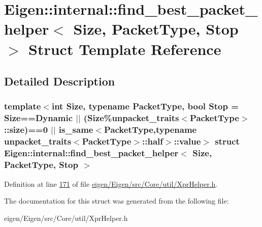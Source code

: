 \hypertarget{struct_eigen_1_1internal_1_1find__best__packet__helper}{}\section{Eigen\+:\+:internal\+:\+:find\+\_\+best\+\_\+packet\+\_\+helper$<$ Size, Packet\+Type, Stop $>$ Struct Template Reference}
\label{struct_eigen_1_1internal_1_1find__best__packet__helper}


\subsection{Detailed Description}
\subsubsection*{template$<$int Size, typename Packet\+Type, bool Stop = Size==\+Dynamic $\vert$$\vert$ (\+Size\%unpacket\+\_\+traits$<$\+Packet\+Type$>$\+::size)==0 $\vert$$\vert$ is\+\_\+same$<$\+Packet\+Type,typename unpacket\+\_\+traits$<$\+Packet\+Type$>$\+::half$>$\+::value$>$\newline
struct Eigen\+::internal\+::find\+\_\+best\+\_\+packet\+\_\+helper$<$ Size, Packet\+Type, Stop $>$}



Definition at line \hyperlink{eigen_2_eigen_2src_2_core_2util_2_xpr_helper_8h_source_l00171}{171} of file \hyperlink{eigen_2_eigen_2src_2_core_2util_2_xpr_helper_8h_source}{eigen/\+Eigen/src/\+Core/util/\+Xpr\+Helper.\+h}.



The documentation for this struct was generated from the following file\+:\begin{DoxyCompactItemize}
\item 
eigen/\+Eigen/src/\+Core/util/\+Xpr\+Helper.\+h\end{DoxyCompactItemize}
